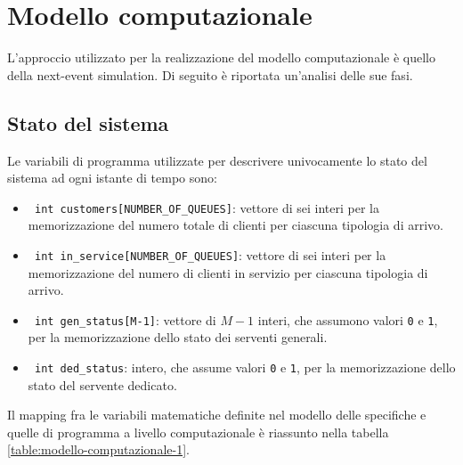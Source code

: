 \chapter{Modello computazionale}\label{chp:modello-computazionale}
L'approccio utilizzato per la realizzazione del modello computazionale è quello della next-event simulation. Di seguito è riportata un'analisi delle sue fasi.
\section{Stato del sistema}\label{sec:modello-computazionale-stato}
Le variabili di programma utilizzate per descrivere univocamente lo stato del sistema ad ogni istante di tempo sono:
\begin{itemize}
\item \texttt{{\color{code_purple} int} customers[NUMBER\_OF\_QUEUES]}: vettore di sei interi per la memorizzazione del numero totale di clienti per ciascuna tipologia di arrivo.
\item \texttt{{\color{code_purple} int} in\_service[NUMBER\_OF\_QUEUES]}: vettore di sei interi per la memorizzazione del numero di clienti in servizio per ciascuna tipologia di arrivo.
\item \texttt{{\color{code_purple} int} gen\_status[M-1]}: vettore di $M-1$ interi, che assumono valori \texttt{0} e \texttt{1}, per la memorizzazione dello stato dei serventi generali.
\item \texttt{{\color{code_purple} int} ded\_status}: intero, che assume valori \texttt{0} e \texttt{1}, per la memorizzazione dello stato del servente dedicato.
\end{itemize}

Il mapping fra le variabili matematiche definite nel modello delle specifiche e quelle di programma a livello computazionale è riassunto nella tabella \ref{table:modello-computazionale-1}. 


